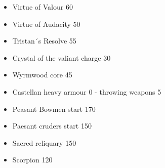 \subtitle{Points}

\begin{itemize}[label={-}]
\item Virtue of Valour 60
\item Virtue of Audacity 50
\item Tristan´s Resolve 55
\item Crystal of the valiant charge 30
\item Wyrmwood core 45
\item Castellan heavy armour 0
- throwing weapons 5
\item Peasant Bowmen start 170
\item Paesant cruders start 150
\item Sacred reliquary 150
\item Scorpion 120
\end{itemize}
